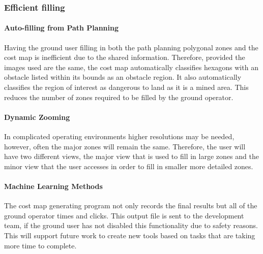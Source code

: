 \subsubsection{Efficient filling}
\paragraph{Auto-filling from Path Planning}
Having the ground user filling in both the path planning polygonal zones and the cost map is inefficient due to the shared information. Therefore, provided the images used are the same, the cost map automatically classifies hexagons with an obstacle listed within its bounds as an obstacle region. It also automatically classifies the region of interest as dangerous to land as it is a mined area. This reduces the number of zones required to be filled by the ground operator. 
\paragraph{Dynamic Zooming}
In complicated operating environments higher resolutions may be needed, however, often the major zones will remain the same. Therefore, the user will have two different views, the major view that is used to fill in large zones and the minor view that the user accesses in order to fill in smaller more detailed zones. 
\paragraph{Machine Learning Methods}
The cost map generating program not only records the final results but all of the ground operator times and clicks. This output file is sent to the development team, if the ground user has not disabled this functionality due to safety reasons. This will support future work to create new tools based on tasks that are taking more time to complete.
